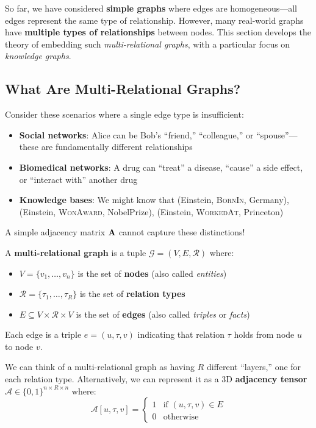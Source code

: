 \begin{notechapter}
So far, we have considered \textbf{simple graphs} where edges are homogeneous---all edges represent the same type of relationship. However, many real-world graphs have \textbf{multiple types of relationships} between nodes. This section develops the theory of embedding such \emph{multi-relational graphs}, with a particular focus on \emph{knowledge graphs}.

\subsection{What Are Multi-Relational Graphs?}

\begin{whybox}
Consider these scenarios where a single edge type is insufficient:
\begin{itemize}
    \item \textbf{Social networks}: Alice can be Bob's ``friend,'' ``colleague,'' or ``spouse''---these are fundamentally different relationships
    \item \textbf{Biomedical networks}: A drug can ``treat'' a disease, ``cause'' a side effect, or ``interact with'' another drug
    \item \textbf{Knowledge bases}: We might know that (Einstein, \textsc{BornIn}, Germany), (Einstein, \textsc{WonAward}, NobelPrize), (Einstein, \textsc{WorkedAt}, Princeton)
\end{itemize}
A simple adjacency matrix $\mathbf{A}$ cannot capture these distinctions!
\end{whybox}

\begin{definition}
A \textbf{multi-relational graph} is a tuple $\mathcal{G} = (V, E, \mathcal{R})$ where:
\begin{itemize}
    \item $V = \{v_1, \ldots, v_n\}$ is the set of \textbf{nodes} (also called \emph{entities})
    \item $\mathcal{R} = \{\tau_1, \ldots, \tau_R\}$ is the set of \textbf{relation types}
    \item $E \subseteq V \times \mathcal{R} \times V$ is the set of \textbf{edges} (also called \emph{triples} or \emph{facts})
\end{itemize}
Each edge is a triple $e = (u, \tau, v)$ indicating that relation $\tau$ holds from node $u$ to node $v$.
\end{definition}

\begin{intuition}
We can think of a multi-relational graph as having $R$ different ``layers,'' one for each relation type. Alternatively, we can represent it as a 3D \textbf{adjacency tensor} $\mathcal{A} \in \{0,1\}^{n \times R \times n}$ where:
\[
\mathcal{A}[u, \tau, v] = \begin{cases} 1 & \text{if } (u, \tau, v) \in E \\ 0 & \text{otherwise} \end{cases}
\]
\end{intuition}


\end{notechapter}
